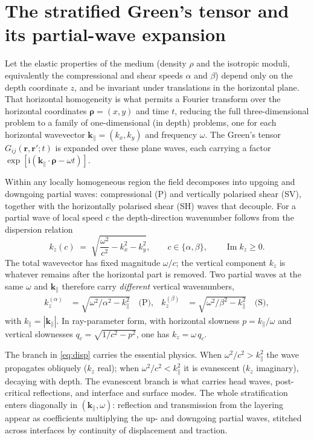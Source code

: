 \documentclass[11pt,a4paper]{article}
\newcommand{\ii}{\mathrm{i}}
\newcommand{\Imm}{\operatorname{Im}}
\newcommand{\kpar}{\mathbf{k}_{\parallel}}
\newcommand{\vr}{\mathbf{r}}
\newcommand{\brho}{\boldsymbol{\rho}}
\begin{document}
\tableofcontents
\bigskip

\section{The stratified Green's tensor and its partial-wave expansion}

Let the elastic properties of the medium (density $\rho$ and the isotropic moduli,
equivalently the compressional and shear speeds $\alpha$ and $\beta$) depend only on the
depth coordinate $z$, and be invariant under translations in the horizontal plane. That
horizontal homogeneity is what permits a Fourier transform over the horizontal coordinates
$\brho=(x,y)$ and time $t$, reducing the full three-dimensional problem to a family of
one-dimensional (in depth) problems, one for each horizontal wavevector $\kpar=(k_x,k_y)$
and frequency $\omega$. The Green's tensor $G_{ij}(\vr,\vr';t)$ is expanded over these
plane waves, each carrying a factor $\exp[\ii(\kpar\cdot\brho-\omega t)]$.

Within any locally homogeneous region the field decomposes into upgoing and downgoing
partial waves: compressional (P) and vertically polarised shear (SV), together with the
horizontally polarised shear (SH) waves that decouple. For a partial wave of local speed
$c$ the depth-direction wavenumber follows from the dispersion relation
\begin{equation}
\label{eq:disp}
k_z(c) \;=\; \sqrt{\dfrac{\omega^{2}}{c^{2}} - k_x^{2} - k_y^{2}},
\qquad c\in\{\alpha,\beta\}, \qquad \Imm k_z \ge 0 .
\end{equation}
The total wavevector has fixed magnitude $\omega/c$; the vertical component $k_z$ is
whatever remains after the horizontal part is removed. Two partial waves at the same
$\omega$ and $\kpar$ therefore carry \emph{different} vertical wavenumbers,
\begin{align}
\label{eq:PSdisp}
k_z^{(\alpha)} &= \sqrt{\omega^{2}/\alpha^{2}-k_\parallel^{2}} \quad\text{(P)},
&
k_z^{(\beta)} &= \sqrt{\omega^{2}/\beta^{2}-k_\parallel^{2}} \quad\text{(S)},
\end{align}
with $k_\parallel=|\kpar|$. In ray-parameter form, with horizontal slowness $p=k_\parallel/\omega$
and vertical slownesses $q_c=\sqrt{1/c^{2}-p^{2}}$, one has $k_z=\omega\,q_c$.

The branch in \eqref{eq:disp} carries the essential physics. When $\omega^2/c^2>k_\parallel^2$
the wave propagates obliquely ($k_z$ real); when $\omega^2/c^2<k_\parallel^2$ it is evanescent
($k_z$ imaginary), decaying with depth. The evanescent branch is what carries head waves,
post-critical reflections, and interface and surface modes. The whole stratification enters
diagonally in $(\kpar,\omega)$: reflection and transmission from the layering appear as
coefficients multiplying the up- and downgoing partial waves, stitched across interfaces by
continuity of displacement and traction.
\end{document}
